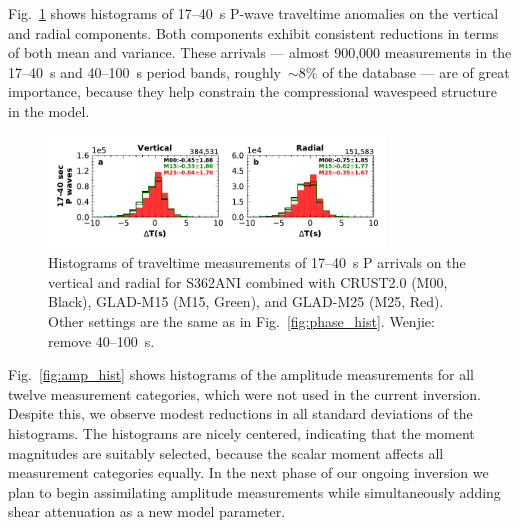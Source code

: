 \documentclass[extra,mreferee]{gji}
\begin{document}
Fig.~\ref{fig:P_phase_hist} shows histograms of 17--40~s P-wave traveltime anomalies on the vertical and radial components.
Both components exhibit consistent reductions in terms of both mean and variance. 
These arrivals --- almost 900,000 measurements in the 17--40~s and 40--100~s period bands, roughly~$\sim8\%$ of the database --- are of great importance, because they help constrain the compressional wavespeed structure in the model.

\begin{figure}
  \centering
  \includegraphics[width=0.8\textwidth]{figures/dt_histogram_P.pdf}
  \caption{Histograms of traveltime measurements of 17--40~s P arrivals on the vertical and radial for S362ANI combined with CRUST2.0 (M00, Black), GLAD-M15 (M15, Green), and GLAD-M25 (M25, Red). Other settings are the same as in Fig.~\ref{fig:phase_hist}. {\color{red}Wenjie: remove 40--100~s.}}
  \label{fig:P_phase_hist}
\end{figure}

Fig.~\ref{fig:amp_hist} shows histograms of the amplitude
measurements for all twelve measurement categories,
which were not used in the current inversion.
Despite this,
we observe modest reductions in all standard deviations of the histograms.
The histograms are nicely centered, indicating that the moment magnitudes are
suitably selected, because the scalar moment affects all measurement categories equally.
In the next phase of our ongoing inversion we plan to begin assimilating amplitude measurements while simultaneously adding shear attenuation as a new model parameter.
\end{document}
